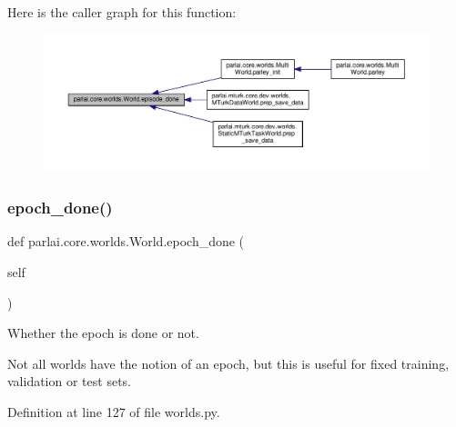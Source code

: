 Here is the caller graph for this function\+:
\nopagebreak
\begin{figure}[H]
\begin{center}
\leavevmode
\includegraphics[width=350pt]{classparlai_1_1core_1_1worlds_1_1World_aaaef76f5bae4cdbe8f78241f8cd7c3a3_icgraph}
\end{center}
\end{figure}
\mbox{\label{classparlai_1_1core_1_1worlds_1_1World_aa8a3ab5345bbfa1d485dec974ed28b53}} 
\subsubsection{\texorpdfstring{epoch\+\_\+done()}{epoch\_done()}}
{\footnotesize\ttfamily def parlai.\+core.\+worlds.\+World.\+epoch\+\_\+done (\begin{DoxyParamCaption}\item[{}]{self }\end{DoxyParamCaption})}

\begin{DoxyVerb}Whether the epoch is done or not.

Not all worlds have the notion of an epoch, but this is useful
for fixed training, validation or test sets.
\end{DoxyVerb}
 

Definition at line 127 of file worlds.\+py.

\mbox{\label{classparlai_1_1core_1_1worlds_1_1World_aa1d3c0cc946f5ade27373f7dc0bd77b5}} 
